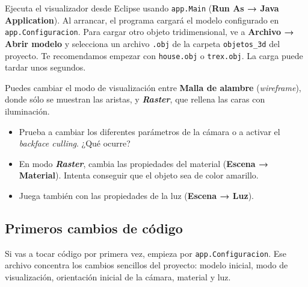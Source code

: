 \documentclass[
  spanish,
  11pt,
  a4paper,
  DIV=11,
  numbers=noendperiod]{scrartcl}
\providecommand{\tightlist}{%
  \setlength{\itemsep}{0pt}\setlength{\parskip}{0pt}}
\begin{document}
Ejecuta el visualizador desde Eclipse usando \texttt{app.Main} (\textbf{Run As → Java Application}). Al arrancar, el programa cargará el modelo configurado en \texttt{app.Configuracion}. Para cargar otro objeto tridimensional, ve a \textbf{Archivo → Abrir modelo} y selecciona un archivo \texttt{.obj} de la carpeta \texttt{objetos\_3d} del proyecto. Te recomendamos empezar con \texttt{house.obj} o \texttt{trex.obj}. La carga puede tardar unos segundos.

Puedes cambiar el modo de visualización entre \textbf{Malla de alambre} (\emph{wireframe}), donde sólo se muestran las aristas, y \textbf{\emph{Raster}}, que rellena las caras con iluminación.

\begin{tcolorbox}[enhanced jigsaw, colframe=quarto-callout-note-color-frame, arc=.35mm, bottomrule=.15mm, left=2mm, breakable, opacityback=0, coltitle=black, bottomtitle=1mm, toptitle=1mm, titlerule=0mm, toprule=.15mm, rightrule=.15mm, title={Experimenta con el visualizador}, colbacktitle=quarto-callout-note-color!10!white, opacitybacktitle=0.6, colback=white, leftrule=.75mm]

\begin{itemize}
\tightlist
\item
  Prueba a cambiar los diferentes parámetros de la cámara o a activar el \emph{backface culling}. ¿Qué ocurre?
\item
  En modo \textbf{\emph{Raster}}, cambia las propiedades del material (\textbf{Escena → Material}). Intenta conseguir que el objeto sea de color amarillo.
\item
  Juega también con las propiedades de la luz (\textbf{Escena → Luz}).
\end{itemize}

\end{tcolorbox}

\subsection{Primeros cambios de código}

\label{primeros-cambios-de-código}

Si vas a tocar código por primera vez, empieza por \texttt{app.Configuracion}. Ese archivo concentra los cambios sencillos del proyecto: modelo inicial, modo de visualización, orientación inicial de la cámara, material y luz.
\end{document}
